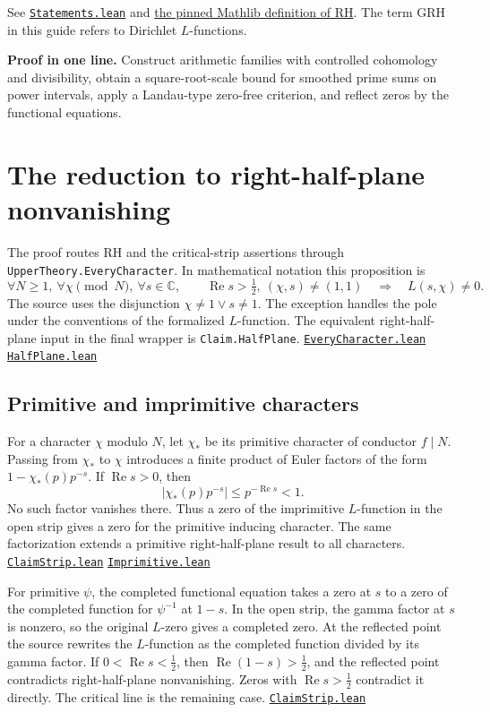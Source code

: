 \documentclass[11pt,a4paper]{article}
\newcommand{\repo}{https://github.com/LiRunGuo/riemann-lean-verification}
\newcommand{\code}[1]{\texttt{#1}}
\newcommand{\src}[2]{\href{\repo/blob/main/lean/src/#1}{\mbox{\nolinkurl{#2}}}}
\newcommand{\cb}{Development/AutomorphicArithmetic/CharacterBoxes}
\newcommand{\RePart}{\operatorname{Re}}
\begin{document}
See \src{Statements.lean}{Statements.lean} and
\href{https://github.com/leanprover-community/mathlib4/blob/0df444a360eaa60ab8c11dca51a86af692955474/Mathlib/NumberTheory/LSeries/RiemannZeta.lean\#L185}{the pinned Mathlib definition of RH}.
The term GRH in this guide refers to Dirichlet $L$-functions.

\vspace{2mm}
\textbf{Proof in one line.}
Construct arithmetic families with controlled cohomology and divisibility,
obtain a square-root-scale bound for smoothed prime sums on power intervals,
apply a Landau-type zero-free criterion, and reflect zeros by the functional
equations.

\clearpage
\section{The reduction to right-half-plane nonvanishing}

The proof routes RH and the critical-strip assertions through
\code{UpperTheory.EveryCharacter}. In mathematical notation this proposition is
\[
  \forall N\ge 1,\ \forall \chi\pmod N,\ \forall s\in\mathbb C,
  \qquad
  \RePart s>\tfrac12,\ (\chi,s)\ne(1,1)
  \quad\Longrightarrow\quad L(s,\chi)\ne0.
\]
The source uses the disjunction $\chi\ne1\lor s\ne1$. The exception handles
the pole under the conventions of the formalized $L$-function. The equivalent
right-half-plane input in the final wrapper is \code{Claim.HalfPlane}.
\src{\cb/EveryCharacter.lean}{EveryCharacter.lean}
\src{\cb/HalfPlane.lean}{HalfPlane.lean}

\subsection*{Primitive and imprimitive characters}

For a character $\chi$ modulo $N$, let $\chi_*$ be its primitive character of
conductor $f\mid N$. Passing from $\chi_*$ to $\chi$ introduces a finite product
of Euler factors of the form $1-\chi_*(p)p^{-s}$. If $\RePart s>0$, then
\[
  \bigl|\chi_*(p)p^{-s}\bigr|
     \le p^{-\RePart s}<1 .
\]
No such factor vanishes there. Thus a zero of the imprimitive $L$-function in
the open strip gives a zero for the primitive inducing character. The same
factorization extends a primitive right-half-plane result to all characters.
\src{\cb/ClaimStrip.lean}{ClaimStrip.lean}
\src{\cb/Imprimitive.lean}{Imprimitive.lean}

For primitive $\psi$, the completed functional equation takes a zero at $s$
to a zero of the completed function for $\psi^{-1}$ at $1-s$. In the open
strip, the gamma factor at $s$ is nonzero, so the original $L$-zero gives a
completed zero. At the reflected point the source rewrites the $L$-function
as the completed function divided by its gamma factor. If
$0<\RePart s<\tfrac12$, then $\RePart(1-s)>\tfrac12$, and the reflected point
contradicts right-half-plane nonvanishing. Zeros with $\RePart s>\tfrac12$
contradict it directly. The critical line is the remaining case.
\src{\cb/ClaimStrip.lean}{ClaimStrip.lean}
\end{document}
